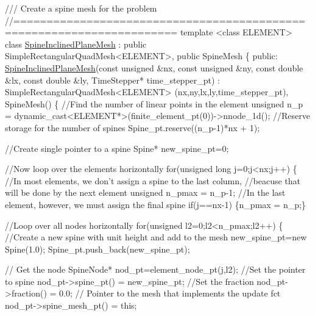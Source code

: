  
\begin{DoxyCodeInclude}
\textcolor{comment}{/// Create a spine mesh for the problem}
\textcolor{comment}{//======================================================================}
\textcolor{keyword}{template} <\textcolor{keyword}{class} ELEMENT>
\textcolor{keyword}{class }\hyperlink{classSpineInclinedPlaneMesh}{SpineInclinedPlaneMesh} : 
 \textcolor{keyword}{public} SimpleRectangularQuadMesh<ELEMENT>,
 \textcolor{keyword}{public} SpineMesh
\{
\textcolor{keyword}{public}:
 \hyperlink{classSpineInclinedPlaneMesh_a97e770220d4cd41e11c86c5cfa289133}{SpineInclinedPlaneMesh}(\textcolor{keyword}{const} \textcolor{keywordtype}{unsigned} &nx, \textcolor{keyword}{const} \textcolor{keywordtype}{unsigned} &ny,
                        \textcolor{keyword}{const} \textcolor{keywordtype}{double} &lx, \textcolor{keyword}{const} \textcolor{keywordtype}{double} &ly,
                        TimeStepper* time\_stepper\_pt) :
  SimpleRectangularQuadMesh<ELEMENT>
 (nx,ny,lx,ly,time\_stepper\_pt), SpineMesh()
  \{
   \textcolor{comment}{//Find the number of linear points in the element}
   \textcolor{keywordtype}{unsigned} n\_p =  \textcolor{keyword}{dynamic\_cast<}ELEMENT*\textcolor{keyword}{>}(finite\_element\_pt(0))->nnode\_1d();
   \textcolor{comment}{//Reserve storage for the number of spines}
   Spine\_pt.reserve((n\_p-1)*nx + 1);
   
   \textcolor{comment}{//Create single pointer to a spine}
   Spine* new\_spine\_pt=0;

   \textcolor{comment}{//Now loop over the elements horizontally}
   \textcolor{keywordflow}{for}(\textcolor{keywordtype}{unsigned} \textcolor{keywordtype}{long} j=0;j<nx;j++)
    \{
     \textcolor{comment}{//In most elements, we don't assign a spine to the last column,}
     \textcolor{comment}{//beacuse that will be done by the next element}
     \textcolor{keywordtype}{unsigned} n\_pmax = n\_p-1;
     \textcolor{comment}{//In the last element, however, we must assign the final spine}
     \textcolor{keywordflow}{if}(j==nx-1) \{n\_pmax = n\_p;\}

     \textcolor{comment}{//Loop over all nodes horizontally}
     \textcolor{keywordflow}{for}(\textcolor{keywordtype}{unsigned} l2=0;l2<n\_pmax;l2++)
      \{
       \textcolor{comment}{//Create a new spine with unit height and add to the mesh}
       new\_spine\_pt=\textcolor{keyword}{new} Spine(1.0);
       Spine\_pt.push\_back(new\_spine\_pt);
       
       \textcolor{comment}{// Get the node}
       SpineNode* nod\_pt=element\_node\_pt(j,l2);
       \textcolor{comment}{//Set the pointer to spine}
       nod\_pt->spine\_pt() = new\_spine\_pt;
       \textcolor{comment}{//Set the fraction}
       nod\_pt->fraction() = 0.0;
       \textcolor{comment}{// Pointer to the mesh that implements the update fct}
       nod\_pt->spine\_mesh\_pt() = \textcolor{keyword}{this}; 
       

\end{DoxyCodeInclude}
